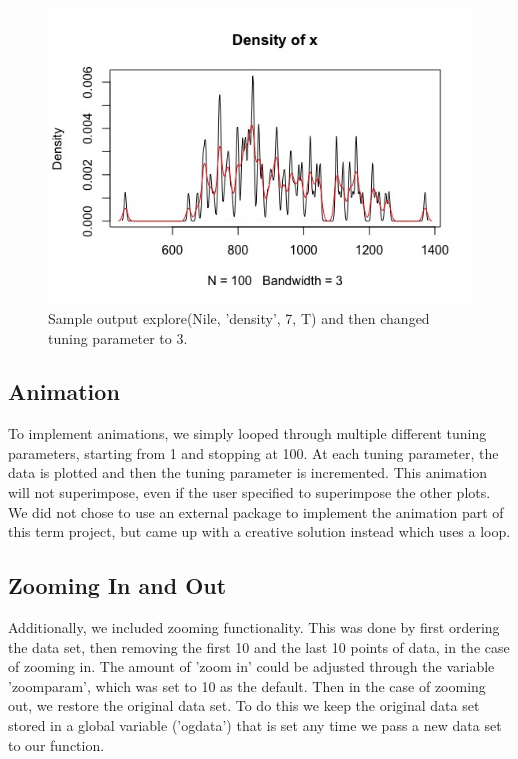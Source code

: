 \documentclass{article}
\begin{document}
\begin{figure}[H]
\centering
\includegraphics[scale=0.5]{Nile, 7 superimposed on 3.jpeg}
\caption{Sample output explore(Nile, 'density', 7, T) and then changed tuning parameter to 3. }
\label{fig:Nile density graph 3 on 7}
\end{figure}

\subsection{Animation}
To implement animations, we simply looped through multiple different tuning parameters, starting from 1 and stopping at 100. At each tuning parameter, the data is plotted and then the tuning parameter is incremented. This animation will not superimpose, even if the user specified to superimpose the other plots. We did not chose to use an external package to implement the animation part of this term project, but came up with a creative solution instead which uses a loop.

\subsection{Zooming In and Out}
Additionally, we included zooming functionality. This was done by first ordering the data set, then removing the first 10 and the last 10 points of data, in the case of zooming in. The amount of 'zoom in' could be adjusted through the variable 'zoomparam', which was set to 10 as the default. Then in the case of zooming out, we restore the original data set. To do this we keep the original data set stored in a global variable ('ogdata') that is set any time we pass a new data set to our function.
\end{document}
